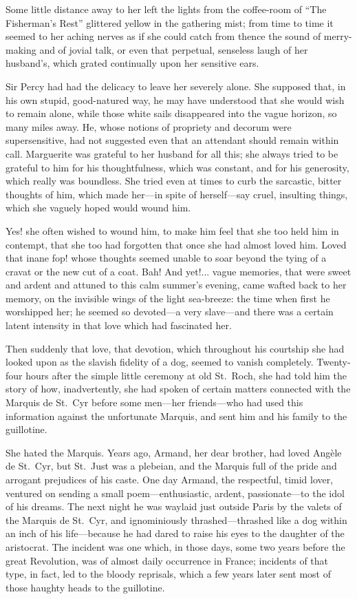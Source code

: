 \documentclass[paper=a5,BCOR=7mm,twoside,DIV=calc,12pt,usegeometry,chapterprefix,endperiod,headings=big]{scrbook}
\begin{document}
Some little distance away to her left the lights from the coffee-room of \enquote{The Fisherman's Rest} glittered yellow in the gathering mist; from time to time it seemed to her aching nerves as if she could catch from thence the sound of merry-making and of jovial talk, or even that perpetual, senseless laugh of her husband's, which grated continually upon her sensitive ears.

Sir Percy had had the delicacy to leave her severely alone. She supposed that, in his own stupid, good-natured way, he may have understood that she would wish to remain alone, while those white sails disappeared into the vague horizon, so many miles away. He, whose notions of propriety and decorum were supersensitive, had not suggested even that an attendant should remain within call. Marguerite was grateful to her husband for all this; she always tried to be grateful to him for his thoughtfulness, which was constant, and for his generosity, which really was boundless. She tried even at times to curb the sarcastic, bitter thoughts of him, which made her---in spite of herself---say cruel, insulting things, which she vaguely hoped would wound him.

Yes! she often wished to wound him, to make him feel that she too held him in contempt, that she too had forgotten that once she had almost loved him. Loved that inane fop! whose thoughts seemed unable to soar beyond the tying of a cravat or the new cut of a coat. Bah! And yet!... vague memories, that were sweet and ardent and attuned to this calm summer's evening, came wafted back to her memory, on the invisible wings of the light sea-breeze: the time when first he worshipped her; he seemed so devoted---a very slave---and there was a certain latent intensity in that love which had fascinated her.

Then suddenly that love, that devotion, which throughout his courtship she had looked upon as the slavish fidelity of a dog, seemed to vanish completely. Twenty-four hours after the simple little ceremony at old St.~Roch, she had told him the story of how, inadvertently, she had spoken of certain matters connected with the Marquis de St.~Cyr before some men---her friends---who had used this information against the unfortunate Marquis, and sent him and his family to the guillotine.

She hated the Marquis. Years ago, Armand, her dear brother, had loved Angèle de St.~Cyr, but St.~Just was a plebeian, and the Marquis full of the pride and arrogant prejudices of his caste. One day Armand, the respectful, timid lover, ventured on sending a small poem---enthusiastic, ardent, passionate---to the idol of his dreams. The next night he was waylaid just outside Paris by the valets of the Marquis de St.~Cyr, and ignominiously thrashed---thrashed like a dog within an inch of his life---because he had dared to raise his eyes to the daughter of the aristocrat. The incident was one which, in those days, some two years before the great Revolution, was of almost daily occurrence in France; incidents of that type, in fact, led to the bloody reprisals, which a few years later sent most of those haughty heads to the guillotine.
\end{document}
